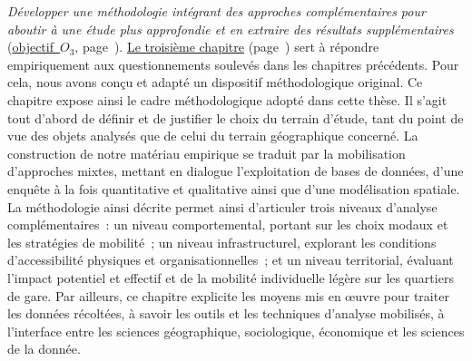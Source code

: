 \textsl{Développer une méthodologie intégrant des approches complémentaires pour aboutir à une étude plus approfondie et en extraire des résultats supplémentaires} (\hyperref[objectif-3]{objectif~\(O_3\)}, page~\pageref{objectif-3}). \hyperref[chap3:titre]{Le troisième chapitre} (page~\pageref{chap3:titre}) sert à répondre empiriquement aux questionnements soulevés dans les chapitres précédents. Pour cela, nous avons conçu et adapté un dispositif méthodologique original. Ce chapitre expose ainsi le cadre méthodologique adopté dans cette thèse. Il s’agit tout d’abord de définir et de justifier le choix du terrain d’étude, tant du point de vue des objets analysés que de celui du terrain géographique concerné. La construction de notre matériau empirique se traduit par la mobilisation d'approches mixtes, mettant en dialogue l'exploitation de bases de données, d'une enquête à la fois quantitative et qualitative ainsi que d'une modélisation spatiale. La méthodologie ainsi décrite permet ainsi d'articuler trois niveaux d'analyse complémentaires~: un niveau comportemental, portant sur les choix modaux et les stratégies de mobilité~; un niveau infrastructurel, explorant les conditions d'accessibilité physiques et organisationnelles~; et un niveau territorial, évaluant l'impact potentiel et effectif et de la mobilité individuelle légère sur les quartiers de gare. Par ailleurs, ce chapitre explicite les moyens mis en œuvre pour traiter les données récoltées, à savoir les outils et les techniques d'analyse mobilisés, à l'interface entre les sciences géographique, sociologique, économique et les sciences de la donnée.%